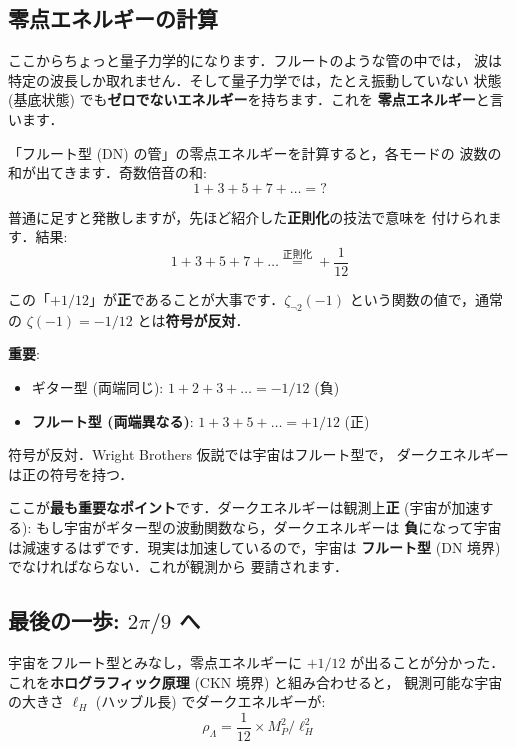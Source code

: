 \documentclass[11pt,a4paper]{article}
\begin{document}
\subsection{零点エネルギーの計算}

ここからちょっと量子力学的になります．フルートのような管の中では，
波は特定の波長しか取れません．そして量子力学では，たとえ振動していない
状態 (基底状態) でも\textbf{ゼロでないエネルギー}を持ちます．これを
\textbf{零点エネルギー}と言います．

「フルート型 (DN) の管」の零点エネルギーを計算すると，各モードの
波数の和が出てきます．奇数倍音の和:
\begin{equation*}
1 + 3 + 5 + 7 + \ldots = ?
\end{equation*}

普通に足すと発散しますが，先ほど紹介した\textbf{正則化}の技法で意味を
付けられます．結果:
\begin{equation*}
1 + 3 + 5 + 7 + \ldots \stackrel{\text{正則化}}{=} +\frac{1}{12}
\end{equation*}

この「$+1/12$」が\textbf{正}であることが大事です．$\zeta_{\neg 2}(-1)$
という関数の値で，通常の $\zeta(-1) = -1/12$ とは\textbf{符号が反対}．

\begin{tcolorbox}[colback=yellow!5,colframe=orange!60!black]
\textbf{重要}:
\begin{itemize}
\item ギター型 (両端同じ): $1 + 2 + 3 + \ldots = -1/12$ (負)
\item \textbf{フルート型 (両端異なる)}: $1 + 3 + 5 + \ldots = +1/12$ (正)
\end{itemize}

符号が反対．Wright Brothers 仮説では宇宙はフルート型で，
ダークエネルギーは正の符号を持つ．
\end{tcolorbox}

ここが\textbf{最も重要なポイント}です．ダークエネルギーは観測上\textbf{正}
(宇宙が加速する): もし宇宙がギター型の波動関数なら，ダークエネルギーは
\textbf{負}になって宇宙は減速するはずです．現実は加速しているので，宇宙は
\textbf{フルート型} (DN 境界) でなければならない．これが観測から
要請されます．

\subsection{最後の一歩: $2\pi/9$ へ}

宇宙をフルート型とみなし，零点エネルギーに $+1/12$ が出ることが分かった．
これを\textbf{ホログラフィック原理} (CKN 境界) と組み合わせると，
観測可能な宇宙の大きさ $\ell_H$ (ハッブル長) でダークエネルギーが:
\begin{equation*}
\rho_\Lambda = \frac{1}{12} \times M_P^2 / \ell_H^2
\end{equation*}
\end{document}

